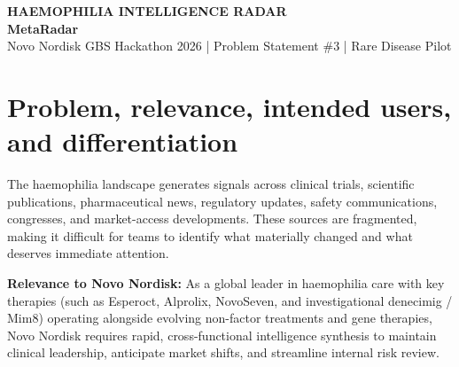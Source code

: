 \documentclass[10pt,a4paper]{article}
\begin{document}
\fontsize{7.4pt}{9.0pt}\selectfont

\begin{center}
{\fontsize{16.5}{17.5}\selectfont\bfseries\color{Navy}HAEMOPHILIA INTELLIGENCE RADAR}\\[-1pt]
{\fontsize{9}{10}\selectfont\color{Blue}\bfseries MetaRadar}\\[2pt]
{\fontsize{6.8}{7.6}\selectfont Novo Nordisk GBS Hackathon 2026 | Problem Statement \#3 | Rare Disease Pilot}
\end{center}
\vspace{-3pt}
\par{}

\section{Problem, relevance, intended users, and differentiation}
The haemophilia landscape generates signals across clinical trials, scientific publications, pharmaceutical news, regulatory updates, safety communications, congresses, and market-access developments. These sources are fragmented, making it difficult for teams to identify what materially changed and what deserves immediate attention.

\textbf{Relevance to Novo Nordisk:} As a global leader in haemophilia care with key therapies (such as Esperoct, Alprolix, NovoSeven, and investigational denecimig / Mim8) operating alongside evolving non-factor treatments and gene therapies, Novo Nordisk requires rapid, cross-functional intelligence synthesis to maintain clinical leadership, anticipate market shifts, and streamline internal risk review.
\end{document}
